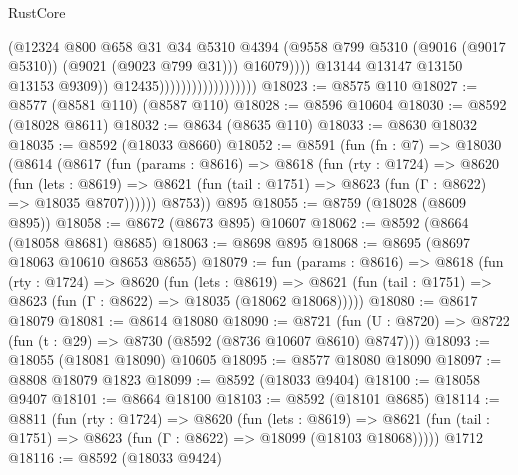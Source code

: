 \begin{lexlean}{RustCore}
\begin{coremodule}
                                                  (@12324
                                                    @800
                                                    @658
                                                    @31
                                                    @34
                                                    @5310
                                                    @4394
                                                    (@9558
                                                      @799
                                                      @5310
                                                      (@9016 (@9017 @5310))
                                                      (@9021 (@9023 @799 @31)))
                                                    @16079))))
                                            @13144
                                            @13147
                                            @13150
                                            @13153
                                            @9309))
                                        @12435))))))))))))))))))
@18023 := @8575 @110
@18027 := @8577 (@8581 @110) (@8587 @110)
@18028 := @8596 @10604
@18030 := @8592 (@18028 @8611)
@18032 := @8634 (@8635 @110)
@18033 := @8630 @18032
@18035 := @8592 (@18033 @8660)
@18052 := @8591
    (fun (fn : @7) =>
    @18030
      (@8614
        (@8617
          (fun (params : @8616) =>
          @8618
            (fun (rty : @1724) =>
            @8620
              (fun (lets : @8619) =>
              @8621 (fun (tail : @1751) => @8623 (fun (Γ : @8622) => @18035 @8707))))))
        @8753))
    @895
@18055 := @8759 (@18028 (@8609 @895))
@18058 := @8672 (@8673 @895) @10607
@18062 := @8592 (@8664 (@18058 @8681) @8685)
@18063 := @8698 @895
@18068 := @8695 (@8697 @18063 @10610 @8653 @8655)
@18079 := fun (params : @8616) =>
  @8618
    (fun (rty : @1724) =>
    @8620
      (fun (lets : @8619) =>
      @8621 (fun (tail : @1751) => @8623 (fun (Γ : @8622) => @18035 (@18062 @18068)))))
@18080 := @8617 @18079
@18081 := @8614 @18080
@18090 := @8721
    (fun (U : @8720) => @8722 (fun (t : @29) => @8730 (@8592 (@8736 @10607 @8610) @8747)))
@18093 := @18055 (@18081 @18090) @10605
@18095 := @8577 @18080 @18090
@18097 := @8808 @18079 @1823
@18099 := @8592 (@18033 @9404)
@18100 := @18058 @9407
@18101 := @8664 @18100
@18103 := @8592 (@18101 @8685)
@18114 := @8811
    (fun (rty : @1724) =>
    @8620
      (fun (lets : @8619) =>
      @8621 (fun (tail : @1751) => @8623 (fun (Γ : @8622) => @18099 (@18103 @18068)))))
    @1712
@18116 := @8592 (@18033 @9424)

\end{coremodule}
\end{lexlean}
